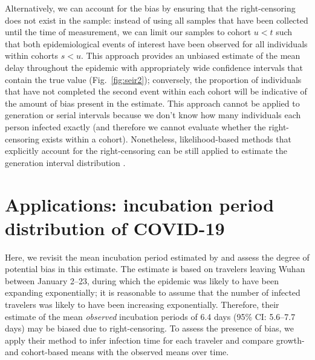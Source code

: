 \documentclass[12pt]{article}
\newcommand{\fref}[1]{Fig.~\ref{fig:#1}}
\newcommand{\comment}[3]{\textcolor{#1}{\textbf{[#2: }\textsl{#3}\textbf{]}}}
\newcommand{\jd}[1]{\comment{cyan}{JD}{#1}}
\begin{document}

Alternatively, we can account for the bias by ensuring that the right-censoring does not exist in the sample:
instead of using all samples that have been collected until the time of measurement, we can limit our samples to cohort $u < t$ such that both epidemiological events of interest have been observed for all individuals within cohorts $s < u$.
This approach provides an unbiased estimate of the mean delay throughout the epidemic with appropriately wide confidence intervals that contain the true value (\fref{seir2});
conversely, the proportion of individuals that have not completed the second event within each cohort will be indicative of the amount of bias present in the estimate.
This approach cannot be applied to generation or serial intervals because we don't know how many individuals each person infected exactly (and therefore we cannot evaluate whether the right-censoring exists within a cohort).
Nonetheless, likelihood-based methods that explicitly account for the right-censoring can be still applied to estimate the generation interval distribution \citep{park2019inferring}.

\section{Applications: incubation period distribution of COVID-19}

Here, we revisit the mean incubation period estimated by \cite{backer2020incubation} and assess the degree of potential bias in this estimate.
The estimate is based on travelers leaving Wuhan between January 2--23, during which the epidemic was likely to have been expanding exponentially; it is reasonable to assume that the number of infected travelers was likely to have been increasing exponentially.
Therefore, their estimate of the mean \emph{observed} incubation periods of 6.4 days (95\% CI: 5.6–7.7 days) may be biased due to right-censoring.
To assess the presence of bias, we apply their method to infer infection time for each traveler and compare growth- and cohort-based means with the observed means over time.
\end{document}
